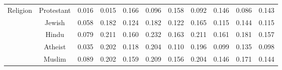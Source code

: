 \begin{table*}[ht]
\begin{tabular}{cc|c|cc|cc|cc|cc}
    \midrule
    \multirow{5}{*}{Religion} &
    Protestant & 0.016 & 0.015 & 0.166 & 0.096 & 0.158 & 0.092 & 0.146 & 0.086 & 0.143 \\
    & Jewish & 0.058 & 0.182 & 0.124 & 0.182 & 0.122 & 0.165 & 0.115 & 0.144 & 0.115 \\
    & Hindu & 0.079 & 0.211 & 0.160 & 0.232 & 0.163 & 0.211 & 0.161 & 0.181 & 0.157 \\
    & Atheist & 0.035 & 0.202 & 0.118 & 0.204 & 0.110 & 0.196 & 0.099 & 0.135 & 0.098 \\
    & Muslim & 0.089 & 0.202 & 0.159 & 0.209 & 0.156 & 0.204 & 0.146 & 0.171 & 0.144 \\
    \bottomrule    
    \end{tabular}
\end{table*}

